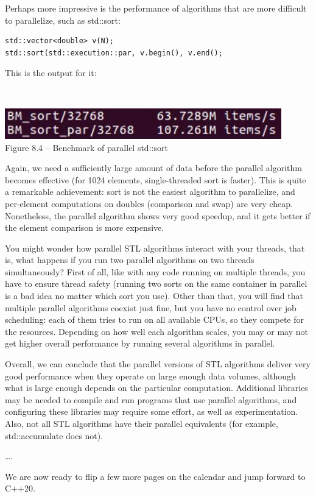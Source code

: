 Perhaps more impressive is the performance of algorithms that are more difficult to parallelize, such as std::sort:

\begin{lstlisting}[style=styleCXX]
std::vector<double> v(N);
std::sort(std::execution::par, v.begin(), v.end();
\end{lstlisting}

This is the output for it:

\hspace*{\fill} \\ %
\begin{center}
\includegraphics[width=0.9\textwidth]{content/2/chapter8/images/4.jpg}\\
Figure 8.4 – Benchmark of parallel std::sort
\end{center}

Again, we need a sufficiently large amount of data before the parallel algorithm becomes effective (for 1024 elements, single-threaded sort is faster). This is quite a remarkable achievement: sort is not the easiest algorithm to parallelize, and per-element computations on doubles (comparison and swap) are very cheap. Nonetheless, the parallel algorithm shows very good speedup, and it gets better if the element comparison is more expensive. 

You might wonder how parallel STL algorithms interact with your threads, that is, what happens if you run two parallel algorithms on two threads simultaneously? First of all, like with any code running on multiple threads, you have to ensure thread safety (running two sorts on the same container in parallel is a bad idea no matter which sort you use). Other than that, you will find that multiple parallel algorithms coexist just fine, but you have no control over job scheduling: each of them tries to run on all available CPUs, so they compete for the resources. Depending on how well each algorithm scales, you may or may not get higher overall performance by running several algorithms in parallel.

Overall, we can conclude that the parallel versions of STL algorithms deliver very good performance when they operate on large enough data volumes, although what is large enough depends on the particular computation. Additional libraries may be needed to compile and run programs that use parallel algorithms, and configuring these libraries may require some effort, as well as experimentation. Also, not all STL algorithms have their parallel equivalents (for example, std::accumulate does not).

….

We are now ready to flip a few more pages on the calendar and jump forward to C++20.














